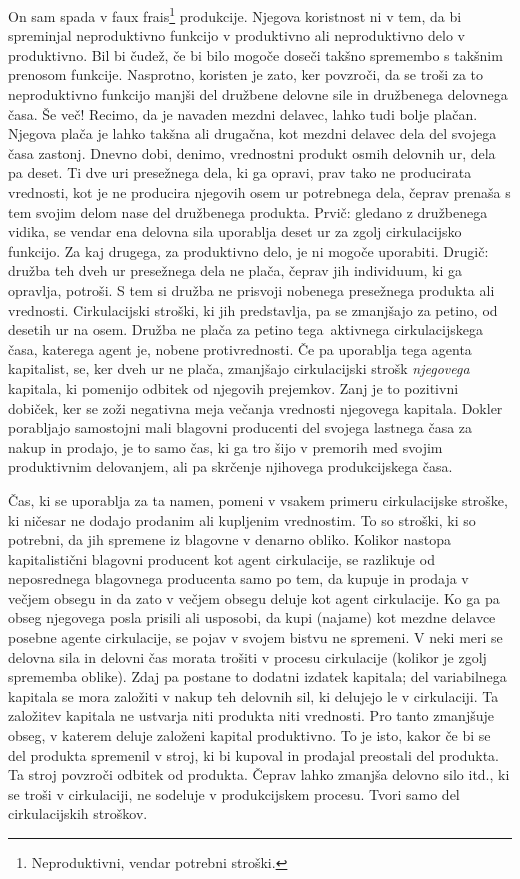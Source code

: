 \documentclass[kapital_02.tex]{subfiles}
\begin{document}
On sam spada v faux frais\footnote{Neproduktivni, vendar potrebni stroški.} %
produkcije.
Njegova koristnost ni v tem, da bi spreminjal neproduktivno funkcijo v produktivno ali neproduktivno delo v produktivno.
Bil bi čudež, če bi bilo mogoče doseči takšno spremembo s takšnim prenosom funkcije.
Nasprotno, koristen je zato, ker povzroči, da se troši za to neproduktivno funkcijo manjši del družbene delovne sile in družbenega delovnega časa.
Še več!
Recimo, da je navaden mezdni delavec, lahko tudi bolje plačan.
Njegova plača je lahko takšna ali drugačna, kot mezdni delavec dela del svojega časa zastonj.
Dnevno dobi, denimo, vrednostni produkt osmih delovnih ur, dela pa deset.
Ti dve uri presežnega dela, ki ga opravi, prav tako ne producirata vrednosti, kot je ne producira njegovih osem ur potrebnega dela, čeprav prenaša s tem svojim delom nase del družbenega produkta.
Prvič: gledano z družbenega vidika, se vendar ena delovna sila uporablja deset ur za zgolj cirkulacijsko funkcijo.
Za kaj drugega, za produktivno delo, je ni mogoče uporabiti. Drugič: družba teh dveh ur presežnega dela ne plača, čeprav jih individuum, ki ga opravlja, potroši.
S tem si družba ne prisvoji nobenega presežnega produkta ali vrednosti.
Cirkulacijski stroški, ki jih predstavlja, pa se zmanjšajo za petino, od desetih ur na osem.
Družba ne plača za petino tega\KPEstran\ aktivnega cirkulacijskega časa, katerega agent je, nobene protivrednosti. Če pa uporablja tega agenta kapitalist, se, ker dveh ur ne plača, zmanjšajo cirkulacijski strošk \emph{njegovega} kapitala, ki pomenijo odbitek od njegovih prejemkov.
Zanj je to pozitivni dobiček, ker se zoži negativna meja večanja vrednosti njegovega kapitala.
Dokler porabljajo samostojni mali blagovni producenti del svojega lastnega časa za nakup in prodajo, je to samo čas, ki ga tro šijo v premorih med svojim produktivnim delovanjem, ali pa skrčenje njihovega produkcijskega časa.

Čas, ki se uporablja za ta namen, pomeni v vsakem primeru cirkulacijske stroške, ki ničesar ne dodajo prodanim ali kupljenim vrednostim.
To so stroški, ki so potrebni, da jih spremene iz blagovne v denarno obliko. 
Kolikor nastopa kapitalistični blagovni producent kot agent cirkulacije, se razlikuje od neposrednega blagovnega producenta samo po tem, da kupuje in prodaja v večjem obsegu in da zato v večjem obsegu deluje kot agent cirkulacije.
Ko ga pa obseg njegovega posla prisili ali usposobi, da kupi (najame) kot mezdne delavce posebne agente cirkulacije, se pojav v svojem bistvu ne spremeni.
V neki meri se delovna sila in delovni čas morata trošiti v procesu cirkulacije (kolikor je zgolj sprememba oblike). 
Zdaj pa postane to dodatni izdatek kapitala; del variabilnega kapitala se mora založiti v nakup teh delovnih sil, ki delujejo le v cirkulaciji.
Ta založitev kapitala ne ustvarja niti produkta niti vrednosti.
Pro tanto zmanjšuje obseg, v katerem deluje založeni kapital produktivno.
To je isto, kakor če bi se del produkta spremenil v stroj, ki bi kupoval in prodajal preostali del produkta.
Ta stroj povzroči odbitek od produkta.
Čeprav lahko zmanjša delovno silo itd., ki se troši v cirkulaciji, ne sodeluje v produkcijskem procesu.
Tvori samo del cirkulacijskih stroškov.
\end{document}
